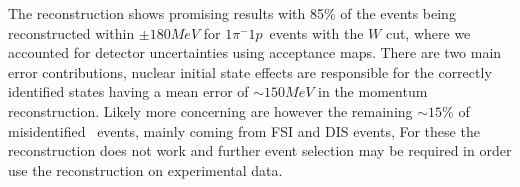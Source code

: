 \documentclass[a4paper,12pt]{article}
\newcommand{\md}{$1\pi^-1p$}
\begin{document}
The reconstruction shows promising results with 85\% of the events being reconstructed within $\pm 180\si{MeV}$ for \md\ events with the $W$ cut, where we accounted for detector uncertainties using acceptance maps.
There are two main error contributions, nuclear initial state effects are responsible for the correctly identified states having a mean error of $\sim 150 \si{MeV}$ in the momentum reconstruction.
Likely more concerning are however the remaining $\sim 15\%$ of misidentified \dm\ events, mainly coming from FSI and DIS events,
For these the reconstruction does not work and further event selection may be required in order use the reconstruction on experimental data.

\newpage

\printbibliography

\newpage
\end{document}
